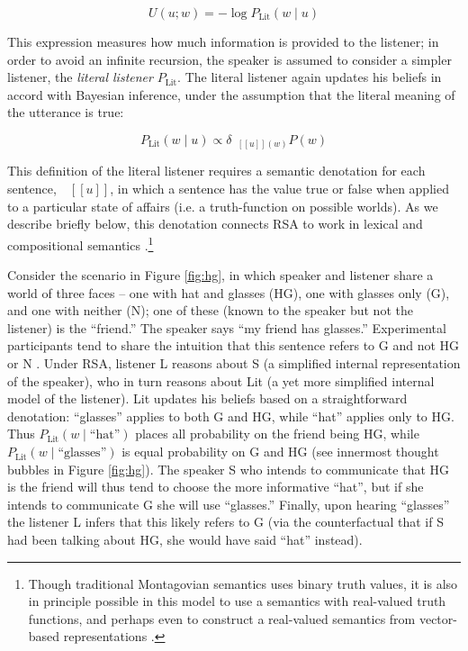 \documentclass[]{elsarticle}
\newcommand{\denote}[1]{\mbox{ $[\![ #1 ]\!]$}}
\begin{document}
$$U(u;w) = -\log P_{\text{Lit}}(w \mid u)$$

This expression measures how much information is provided to the
listener; in order to avoid an infinite recursion, the speaker is
assumed to consider a simpler listener, the \emph{literal listener}
$P_{\text{Lit}}$. The literal listener again updates his beliefs in
accord with Bayesian inference, under the assumption that the literal
meaning of the utterance is true:

$$P_{\text{Lit}}(w\mid u) \propto \delta_{\denote{u}(w)}P(w)$$

This definition of the literal listener requires a semantic denotation
for each sentence, $\denote{u}$, in which a sentence
has the value true or false when applied to a particular state of
affairs (i.e. a truth-function on possible worlds). As we describe
briefly below, this denotation connects RSA to work in lexical and
compositional semantics \cite{dowty2002}.\footnote{Though
  traditional Montagovian semantics uses binary truth values, it is also
  in principle possible in this model to use a semantics with
  real-valued truth functions, and perhaps even to construct a
  real-valued semantics from vector-based representations \citep{monroe2015}.}

Consider the scenario in Figure \ref{fig:hg}, in which speaker and listener share a
world of three faces -- one with hat and glasses (HG), one with glasses
only (G), and one with neither (N); one of these (known to the speaker
but not the listener) is the ``friend.'' The speaker says ``my friend
has glasses.'' Experimental participants tend to share the intuition
that this sentence refers to G and not HG or N \cite{stiller2015}. Under RSA, listener L reasons about S (a simplified
internal representation of the speaker), who in turn reasons about Lit
(a yet more simplified internal model of the listener). Lit updates his
beliefs based on a straightforward denotation: ``glasses'' applies to
both G and HG, while ``hat'' applies only to HG. Thus
$P_{\text{Lit}}(w\mid \text{``hat''})$ places all probability on the friend
being HG, while $P_{\text{Lit}}(w\mid \text{``glasses''})$ is equal probability
on G and HG (see innermost thought bubbles in Figure \ref{fig:hg}). The speaker S
who intends to communicate that HG is the friend will thus tend to
choose the more informative ``hat'', but if she intends to communicate G
she will use ``glasses.'' Finally, upon hearing ``glasses'' the listener
L infers that this likely refers to G (via the counterfactual that if S
had been talking about HG, she would have said ``hat'' instead).
\end{document}

